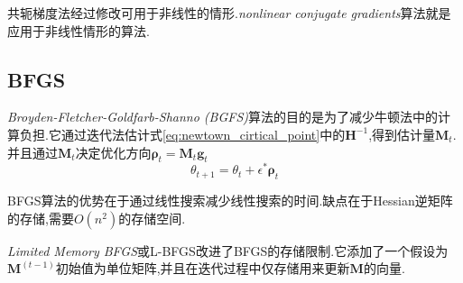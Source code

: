 共轭梯度法经过修改可用于非线性的情形.\textit{nonlinear conjugate gradients}算法就是应用于非线性情形的算法.

\subsection{BFGS}

\textit{Broyden-Fletcher-Goldfarb-Shanno (BGFS)}算法的目的是为了减少牛顿法中的计算负担.它通过迭代法估计式\ref{eq:newtown_cirtical_point}中的$\mathbf H^{-1}$,得到估计量$\mathbf M_t$.并且通过$\mathbf M_t$决定优化方向$\mathbf\rho_t=\mathbf M_t\mathbf g_t$
\begin{equation}
\theta_{t+1}=\theta_t+\epsilon^\ast\mathbf\rho_t
\end{equation}

BFGS算法的优势在于通过线性搜索减少线性搜索的时间.缺点在于Hessian逆矩阵的存储,需要$O(n^2)$的存储空间.

\textit{Limited Memory BFGS}或L-BFGS改进了BFGS的存储限制.它添加了一个假设为$\mathbf M^{(t-1)}$初始值为单位矩阵,并且在迭代过程中仅存储用来更新$\mathbf M$的向量.
